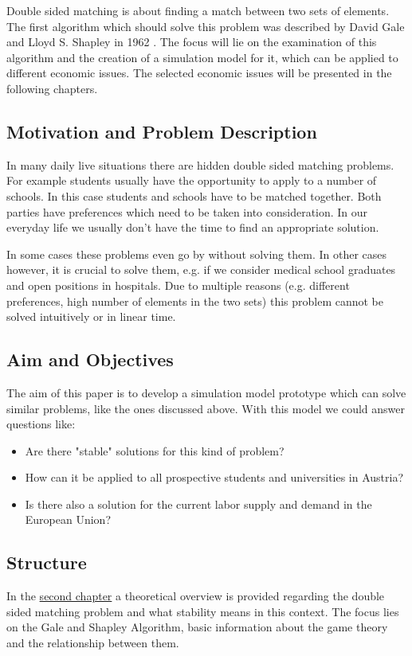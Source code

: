 \label{introduction}
Double sided matching is about finding a match between two sets of elements.
The first algorithm which should solve this problem was described by David Gale and Lloyd S. Shapley in 1962 \cite{gale62a}. 
The focus will lie on the examination of this algorithm and the creation of a simulation model for it, which can be applied to different economic issues.
The selected economic issues will be presented in the following chapters. 

\subsection{Motivation and Problem Description}
In many daily live situations there are hidden double sided matching problems. 
For example students usually have the opportunity to apply to a number of schools. 
In this case students and schools have to be matched together. 
Both parties have preferences which need to be taken into consideration. 
In our everyday life we usually don't have the time to find an appropriate solution. 

In some cases these problems even go by without solving them. 
In other cases however, it is crucial to solve them, e.g. if we consider medical school graduates and open positions in hospitals. 
Due to multiple reasons (e.g. different preferences, high number of elements in the two sets) this problem cannot be solved intuitively or in linear time.

\subsection{Aim and Objectives}
The aim of this paper is to develop a simulation model prototype which can solve similar problems, like the ones discussed above.
With this model we could answer questions like:
\begin{itemize}
	\item Are there "stable" solutions for this kind of problem?
	\item How can it be applied to all prospective students and universities in Austria?
	\item Is there also a solution for the current labor supply and demand in the European Union?
\end{itemize}

\subsection{Structure}
In the \hyperref[theory]{second chapter} a theoretical overview is provided regarding the double sided matching problem and what stability means in this context.
The focus lies on the Gale and Shapley Algorithm, basic information about the game theory and the relationship between them.

